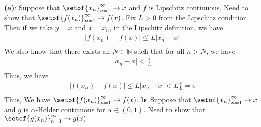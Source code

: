 \documentclass[answers,12pt,addpoints]{exam}
\begin{document}
\begin{questions}
        \begin{solution}
            \textbf{(a)}: Suppose that $\setof{x_n}_{n=1}^{\infty} \to x$ and $f$ is Lipschitz continuous. Need to show that $\setof{f(x_n)}_{n=1}^{\infty} \to f(x)$. Fix $L >0$ from the Lipschitz condition. Then if we take $y = x$ and $x = x_n$, in the Lipschitz definition, we have
            \begin{align*}
                |f(x_n) - f(x)| \leq L|x_n - x|\\
            \end{align*}
            We also know that there exists an $N \in \mathbb{N}$ such that for all $n > N$, we have
            \begin{align*}
                |x_n - x| < \frac{\epsilon}{L}\\
            \end{align*}
            Thus, we have
            \begin{align*}
                |f(x_n) - f(x)| \leq L|x_n - x| < L\frac{\epsilon}{L} = \epsilon\\
            \end{align*}
            Thus, We have $\setof{f(x_n)}_{n=1}^{\infty} \to f(x)$.
            \textbf{b}: 
            Suppose that $\setof{x_n}_{n=1}^{\infty} \to x$ and $g$ is $\alpha$-Hölder continuous for $\alpha \in (0,1)$. Need to show that $\setof{g(x_n)}_{n=1}^{\infty} \to g(x)$

\end{solution}
\end{questions}
\end{document}
